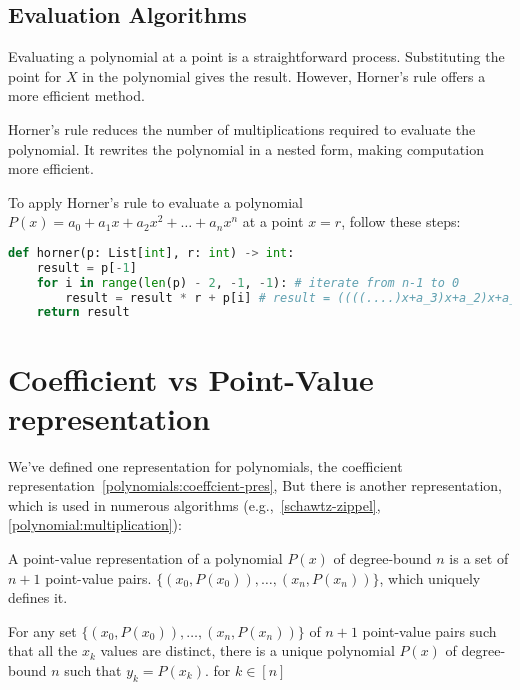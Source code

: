 \subsection{Evaluation Algorithms}
Evaluating a polynomial at a point is a straightforward process.
Substituting the point for $X$ in the polynomial gives the result. 
However, Horner's rule offers a more efficient method.

Horner's rule reduces the number of multiplications required to evaluate the polynomial.
It rewrites the polynomial in a nested form, making computation more efficient.

To apply Horner's rule to evaluate a polynomial $P(x) = a_0 + a_1x + a_2x^2 + \dots + a_nx^n$ at a 
point $x = r$, follow these steps:

\begin{lstlisting}[language=Python,
  caption={Horner's rule algorithm in python}
]
def horner(p: List[int], r: int) -> int:
    result = p[-1]
    for i in range(len(p) - 2, -1, -1): # iterate from n-1 to 0
        result = result * r + p[i] # result = ((((....)x+a_3)x+a_2)x+a_1)x +a_0 = p(r)
    return result
\end{lstlisting}\label{algorithm:polynomial:evaluation}


\section{Coefficient vs Point-Value representation}\label{polynomials:point-val-representation}
We've defined one representation for polynomials, the coefficient representation~\ref{polynomials:coeffcient-pres},
But there is another representation, which is used in numerous algorithms (e.g.,~\ref{schawtz-zippel},\ref{polynomial:multiplication}):


A point-value representation of a polynomial $P(x)$ of degree-bound $n$ is a set of $n+1$ point-value pairs.
$ \{ (x_0,P(x_0)),\dots , (x_{n}, P(x_{n})) \}$, which uniquely defines it.

\begin{theorem}
  For any set $ \{ (x_0,P(x_0)),\dots , (x_{n}, P(x_{n})) \}$ of $n+1$
  point-value pairs such that all the $x_k$ values are distinct,
  there is a unique polynomial $P(x)$ of degree-bound $n$ such that
  $y_k = P(x_k)$. for $k\in[n]$ 
\end{theorem}

